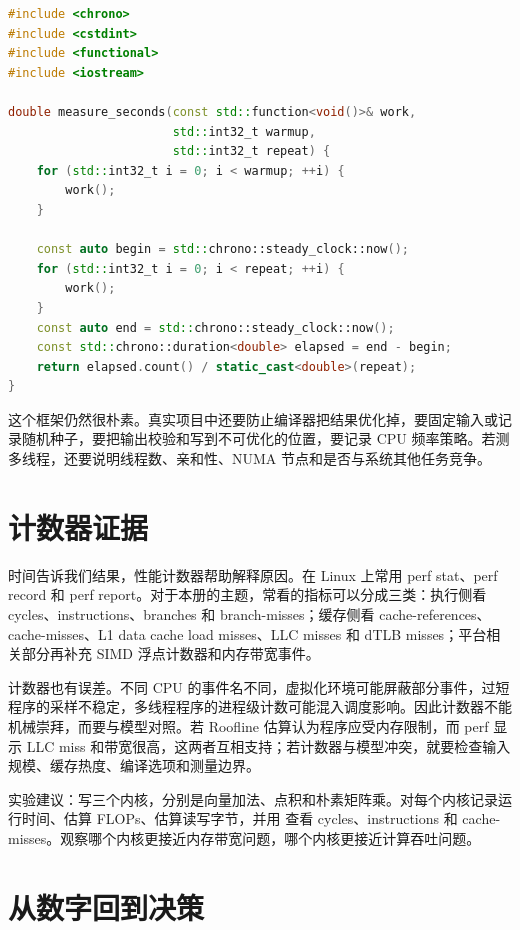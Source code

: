 \begin{lstlisting}[language=C++,caption={最小计时框架：只计核心循环}]
#include <chrono>
#include <cstdint>
#include <functional>
#include <iostream>

double measure_seconds(const std::function<void()>& work,
                       std::int32_t warmup,
                       std::int32_t repeat) {
    for (std::int32_t i = 0; i < warmup; ++i) {
        work();
    }

    const auto begin = std::chrono::steady_clock::now();
    for (std::int32_t i = 0; i < repeat; ++i) {
        work();
    }
    const auto end = std::chrono::steady_clock::now();
    const std::chrono::duration<double> elapsed = end - begin;
    return elapsed.count() / static_cast<double>(repeat);
}
\end{lstlisting}

这个框架仍然很朴素。真实项目中还要防止编译器把结果优化掉，要固定输入或记录随机种子，要把输出校验和写到不可优化的位置，要记录 CPU 频率策略。若测多线程，还要说明线程数、亲和性、NUMA 节点和是否与系统其他任务竞争。

\section{计数器证据}

时间告诉我们结果，性能计数器帮助解释原因。在 Linux 上常用 perf stat、perf record 和 perf report。对于本册的主题，常看的指标可以分成三类：执行侧看 cycles、instructions、branches 和 branch-misses；缓存侧看 cache-references、cache-misses、L1 data cache load misses、LLC misses 和 dTLB misses；平台相关部分再补充 SIMD 浮点计数器和内存带宽事件。

计数器也有误差。不同 CPU 的事件名不同，虚拟化环境可能屏蔽部分事件，过短程序的采样不稳定，多线程程序的进程级计数可能混入调度影响。因此计数器不能机械崇拜，而要与模型对照。若 Roofline 估算认为程序应受内存限制，而 perf 显示 LLC miss 和带宽很高，这两者互相支持；若计数器与模型冲突，就要检查输入规模、缓存热度、编译选项和测量边界。

\begin{labbox}
实验建议：写三个内核，分别是向量加法、点积和朴素矩阵乘。对每个内核记录运行时间、估算 FLOPs、估算读写字节，并用  查看 cycles、instructions 和 cache-misses。观察哪个内核更接近内存带宽问题，哪个内核更接近计算吞吐问题。
\end{labbox}

\section{从数字回到决策}

